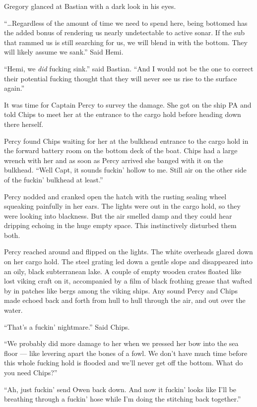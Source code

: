 \documentclass[
]{scrbook}
\begin{document}
Gregory glanced at Bastian with a dark look in his eyes.

``\ldots Regardless of the amount of time we need to spend here, being
bottomed has the added bonus of rendering us nearly undetectable to
active sonar. If the sub that rammed us is still searching for us, we
will blend in with the bottom. They will likely assume we sank.'' Said
Hemi.

``Hemi, we \emph{did} fucking sink.'' said Bastian. ``And I would not be
the one to correct their potential fucking thought that they will never
see us rise to the surface again.''

It was time for Captain Percy to survey the damage. She got on the ship
PA and told Chips to meet her at the entrance to the cargo hold before
heading down there herself.

Percy found Chips waiting for her at the bulkhead entrance to the cargo
hold in the forward battery room on the bottom deck of the boat. Chips
had a large wrench with her and as soon as Percy arrived she banged with
it on the bulkhead. ``Well Capt, it sounds fuckin' hollow to me. Still
air on the other side of the fuckin' bulkhead at least.''

Percy nodded and cranked open the hatch with the rusting sealing wheel
squeaking painfully in her ears. The lights were out in the cargo hold,
so they were looking into blackness. But the air smelled damp and they
could hear dripping echoing in the huge empty space. This instinctively
disturbed them both.

Percy reached around and flipped on the lights. The white overheads
glared down on her cargo hold. The steel grating led down a gentle slope
and disappeared into an oily, black subterranean lake. A couple of empty
wooden crates floated like lost viking craft on it, accompanied by a
film of black frothing grease that wafted by in patches like bergs among
the viking ships. Any sound Percy and Chips made echoed back and forth
from hull to hull through the air, and out over the water.

``That's a fuckin' nightmare.'' Said Chips.

``We probably did more damage to her when we pressed her bow into the
sea floor --- like levering apart the bones of a fowl. We don't have
much time before this whole fucking hold is flooded and we'll never get
off the bottom. What do you need Chips?''

``Ah, just fuckin' send Owen back down. And now it fuckin' looks like
I'll be breathing through a fuckin' hose while I'm doing the stitching
back together.''
\end{document}
